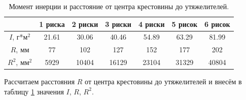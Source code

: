 \documentclass[12pt, a4paper]{article}
\begin{document}
\begin{table}[!h]
\begin{center}
\begin{tabular}{|c|c|c|c|c|c|c|}
\hline
& 1 риска & 2 риски & 3 риски & 4 риски & 5 рисок & 6 рисок \\
\hline
$I$, г*$\text{м}^2$ &21.61 & 30.06 & 40.46 & 54.89 & 63.29 & 81.99\\ 
\hline 
 $R$, $\text{мм}$ &77 & 102 & 127 & 152 & 177 & 202\\ 
\hline 
$R^2$, $\text{мм}^2$ &5929 & 10404 & 16129 & 23104 & 31329 & 40804\\ 
\hline 


\end{tabular}
\caption{Момент инерции и расстояние от центра крестовины до утяжелителей.}
\end{center}
\label{tab:6}
\end{table}

Рассчитаем расстояния $R$ от центра крестовины до утяжелителей и внесём  в таблицу \ref{tab:6} значения $I$, $R$, $R^2$.
\end{document}
